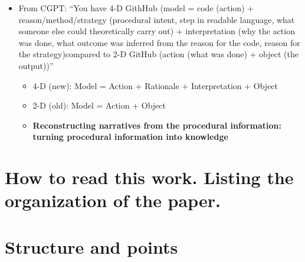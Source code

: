 \documentclass[
]{article}
\begin{document}
\begin{itemize}
\begin{itemize}
    \begin{itemize}
    \item
      From CGPT: ``You have 4-D GithHub (model = code (action) +
      reason/method/strategy (procedural intent, step in readable
      language, what someone else could theoretically carry out) +
      interpretation (why the action was done, what outcome was inferred
      from the reason for the code, reason for the strategy)compared to
      2-D GitHub (action (what was done) + object (the output))''

      \begin{itemize}
      \item
        4-D (new): Model = Action + Rationale + Interpretation + Object
      \item
        2-D (old): Model = Action + Object
      \item
        \textbf{Reconstructing narratives from the procedural
        information: turning procedural information into knowledge}
      \end{itemize}
    \end{itemize}
  \end{itemize}
\end{itemize}

\section{How to read this work. Listing the organization of the
paper.}\label{how-to-read-this-work.-listing-the-organization-of-the-paper.}

\section{Structure and points}\label{structure-and-points}
\end{document}
